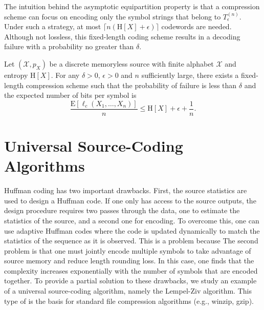 The intuition behind the asymptotic equipartition property is that a compression scheme can focus on encoding only the symbol strings that belong to $T_{\epsilon}^{(n)}$.
Under such a strategy, at most $\lceil n (\mathrm{H}[X] + \epsilon) \rceil$ codewords are needed.
Although not lossless, this fixed-length coding scheme results in a decoding failure with a probability no greater than $\delta$.

\begin{theorem}
Let $(\mathcal{X}, p_X)$ be a discrete memoryless source with finite alphabet $\mathcal{X}$ and entropy $\mathrm{H}[X]$.
For any $\delta > 0$, $\epsilon > 0$ and $n$ sufficiently large, there exists a fixed-length compression scheme such that the probability of failure is less than $\delta$ and the expected number of bits per symbol is
\begin{equation*}
\frac{\mathrm{E} [\ell_c(X_1, \ldots, X_n)]}{n} \leq \mathrm{H}[X] + \epsilon + \frac{1}{n} .
\end{equation*}
\end{theorem}


\section{Universal Source-Coding Algorithms}

Huffman coding has two important drawbacks.
First, the source statistics are used to design a Huffman code.
If one only has access to the source outputs, the design procedure requires two passes through the data, one to estimate the statistics of the source, and a second one for encoding.
To overcome this, one can use adaptive Huffman codes where the code is updated dynamically to match the statistics of the sequence as it is observed.
This is a problem because
The second problem is that one must jointly encode multiple symbols to take advantage of source memory and reduce length rounding loss.
In this case, one finds that the complexity increases exponentially with the number of symbols that are encoded together.
To provide a partial solution to these drawbacks, we study an example of a universal source-coding algorithm, namely the Lempel-Ziv algorithm.
This type of  is the basis for standard file compression algorithms (e.g., winzip, gzip).

